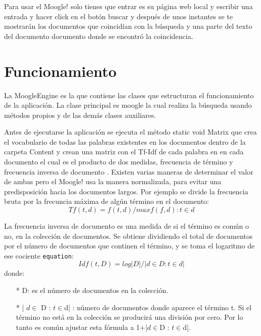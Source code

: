 \documentclass[spanish,10pt,a4paper]{article}
\begin{document}
	Para usar el Moogle! solo tienes que entrar es su página web local y escribir una entrada y hacer click en el botón buscar y después de unos instantes se te mostrarán los documentos que coincidían con la búsqueda y una parte del texto del documento documento donde se encontró la coincidencia.
    
    \section{Funcionamiento}\label{sec:funcionamiento}
    La MoogleEngine es la que contiene las clases que estructuran el funcionamiento de la aplicación. La clase principal es moogle la cual 
    realiza la búsqueda usando métodos propios y de las demás clases auxiliares.
   
    Antes de ejecutarse la aplicación se ejecuta el método static void Matrix que crea el vocabulario de todas las palabras existentes en los documentos dentro de la carpeta Content y crean una matriz con el Tf-Idf de cada palabra en en cada documento el cual es el producto de dos medidas, frecuencia de término y frecuencia inversa de documento . Existen varias maneras de determinar el valor de ambas pero el Moogle! usa la manera normalizada, para evitar una predisposición hacia los documentos largos. Por ejemplo se divide la frecuencia bruta por la frecuncia máxima de algún término en el documento:
     \begin{equation}\label{eq:Tf}
    	        Tf(t,d) = f(t,d)/max{f(f,d): t \in d }    	                   
     \end{equation}
     
     La frecuencia inversa de documento es una medida de si el término es común o no, en la colección de documentos. Se obtiene dividiendo el total de documentos por el número de documentos que continen el término, y se toma el logaritmo de ese cociente \texttt{equation}:
     \begin{equation}\label{eq:Idf}
     	Idf(t, D) = log  |D|/|{d \in D: t \in d}|
     \end{equation}
     donde:
     \begin{itemize}
     	\item[*] D: es el número de documentos en la colección.
           \item[*]| {$d \in $ D : $ t \in $d}| : número de documentos donde aparece el término t. Si el término no está en la colección se producirá una división por cero. Por lo tanto es común ajustar esta fórmula a 1+|{$d \in $D : $t \in $d}|.
                              
     \end{itemize}
    
\end{document}
